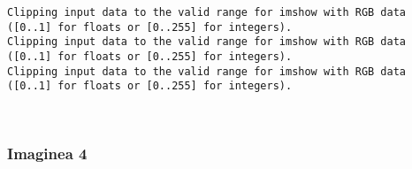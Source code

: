 \documentclass[11pt]{article}
\begin{document}
    \begin{Verbatim}[commandchars=\\\{\}]
Clipping input data to the valid range for imshow with RGB data ([0..1] for floats or [0..255] for integers).
Clipping input data to the valid range for imshow with RGB data ([0..1] for floats or [0..255] for integers).
Clipping input data to the valid range for imshow with RGB data ([0..1] for floats or [0..255] for integers).

    \end{Verbatim}

    \begin{center}
    \end{center}
    { \hspace*{\fill} \\}
    
    \subsubsection{Imaginea 4}\label{imaginea-4}
\end{document}
